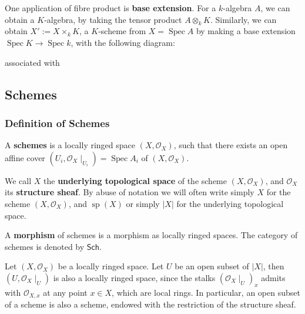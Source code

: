 \documentclass[11pt]{article}
\newcommand{\Spec}{\operatorname{Spec}}
\begin{document}
One application of fibre product is \textbf{base extension}. For a $ k $-algebra $ A $, 
we can obtain a $ K $-algebra, by taking the tensor product $ A \otimes_{k} K $. 
Similarly, we can obtain $ X' := X \times_{k} K$, a $ K $-scheme from $ X = \Spec A$  by making a base extension $ \Spec K \to \Spec k $, 
with the following diagram: 
\begin{center}
    associated with 
\end{center}

\subsection{Schemes}

\subsubsection{Definition of Schemes}

\begin{definition}[Schemes]
    A \textbf{schemes} is a locally ringed space $ (X,\mathscr{O}_{X}) $, such that 
    there exists an open affine cover $ (U_{i},\mathscr{O}_{X}\mid_{U_{i}}) = \Spec A_{i} $ of $ (X,\mathscr{O}_{X}) $. 
    
    We call $ X $ the \textbf{underlying topological space} of the scheme $ (X,\mathscr{O}_{X}) $, 
    and $ \mathscr{O}_{X} $ its \textbf{structure sheaf}. By abuse of notation we will often write 
    simply $ X $ for the scheme $ (X,\mathscr{O}_{X}) $, and $ \operatorname{sp}(X) $ or simply $ |X| $ 
    for the underlying topological space. 

    A \textbf{morphism} of schemes is a morphism as locally ringed spaces. 
    The category of schemes is denoted by $ \mathsf{Sch} $. 
\end{definition}

Let $ (X,\mathscr{O}_{X}) $ be a locally ringed space. Let $ U $ be an open subset of $ |X| $, 
then $ (U,\mathscr{O}_{X}\mid_{U}) $ is also a locally ringed space, since the stalks $ (\mathscr{O}_{X}\mid_{U})_{x} $ 
admits with $ \mathscr{O}_{X,x} $ at any point $ x \in X $, which are local rings. 
In particular, an open subset of a scheme is also a scheme, endowed with the restriction of the structure sheaf. 
\end{document}
